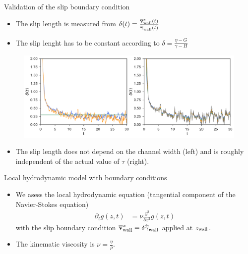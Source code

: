 \documentclass{beamer}
\begin{document}
\begin{frame}{Validation of the slip boundary condition}
  \begin{itemize}
    \item The slip length is measured from 
 $\delta(t)=\frac{\overline{\bf v}^x_{\rm wall}(t)}{\dot{\overline{\gamma}}_{\rm wall}(t)}$
\item The slip lenght has to be constant according to 
  $\delta =\frac{\eta -G}{\gamma-H}$
  \end{itemize}
  \begin{figure}[]
\includegraphics[width=\linewidth]{Slipt-17nodes-WALLS}
  \end{figure}
  \begin{itemize}
    \item The slip length does not depend on the channel width (left) and is roughly independent of the actual value of $\tau$ (right).
  \end{itemize}
\end{frame}

\begin{frame}{Local hydrodynamic model with boundary conditions}  
  \begin{itemize}
    \item We asess the local hydrodynamic equation (tangential component of the Navier-Stokes equation)
\begin{align}
  \partial_t g(z,t)&=\nu\frac{\partial^2}{\partial z^2} g(z,t)
\nonumber
\end{align}
      with the slip boundary condition $\overline{\bf v}^x_{\rm wall}=\delta \dot{\overline{\gamma}}_{\rm wall}$ applied at $z_{\rm wall}$.
    \item The kinematic viscosity is $\nu=\frac{\eta}{\rho}$.
  \end{itemize}
\end{frame}
\end{document}
